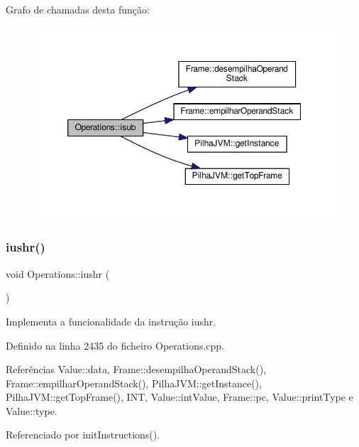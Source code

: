 Grafo de chamadas desta função\+:\nopagebreak
\begin{figure}[H]
\begin{center}
\leavevmode
\includegraphics[width=350pt]{classOperations_ab2808e99336de64fefb2a9073bc251de_cgraph}
\end{center}
\end{figure}
\mbox{\label{classOperations_ae3ab5ae36e587a47832886fdf4f8b2a6}} 
\subsubsection{\texorpdfstring{iushr()}{iushr()}}
{\footnotesize\ttfamily void Operations\+::iushr (\begin{DoxyParamCaption}{ }\end{DoxyParamCaption})\hspace{0.3cm}{\ttfamily [private]}}



Implementa a funcionalidade da instrução iushr. 



Definido na linha 2435 do ficheiro Operations.\+cpp.



Referências Value\+::data, Frame\+::desempilha\+Operand\+Stack(), Frame\+::empilhar\+Operand\+Stack(), Pilha\+J\+V\+M\+::get\+Instance(), Pilha\+J\+V\+M\+::get\+Top\+Frame(), I\+NT, Value\+::int\+Value, Frame\+::pc, Value\+::print\+Type e Value\+::type.



Referenciado por init\+Instructions().

